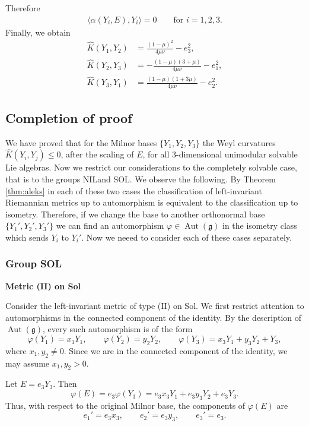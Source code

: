 \documentclass[12pt]{article}
\begin{document}
\noindent Therefore
\begin{align*}
\langle \alpha(Y_i,E),Y_i\rangle=0
\qquad
\text{for } i=1,2,3.
\end{align*}
Finally, we obtain
\begin{align*}
\widehat{K}(Y_1,Y_2) &= 
\frac{(1-\mu)^2}{4\mu\nu} - e_3^2, \\
\widehat{K}(Y_2,Y_3) &= 
-\frac{(1-\mu)(3+\mu)}{4\mu\nu} -e_1^2, \\
\widehat{K}(Y_3,Y_1) &=
\frac{(1-\mu)(1+3\mu)}{4\mu\nu} - e_2^2.
\end{align*}

\subsection{Completion of proof}
We have proved that for the Milnor bases $\{Y_1,Y_2,Y_3\}$ the Weyl curvatures $\widehat{K}(Y_i,Y_j)\leq 0$, after the scaling of $E$, for all 3-dimensional unimodular solvable Lie algebras.  Now we restrict our considerations to the completely solvable case, that is to the groups NILand SOL. We  observe the following. By Theorem \ref{thm:aleks}  in each of these two cases the classification of left-invariant Riemannian metrics up to automorphism is equivalent to the classification  up to isometry. Therefore, if we change the base to another orthonormal base $\{Y_1',Y_2',Y_3'\}$ we can find an automorphism $\varphi\in\operatorname{Aut}(\mathfrak{g})$  in the isometry class which sends $Y_i$ to $Y_i'$.
Now we neeed to consider each of these cases separately.

\subsubsection{Group SOL}
\vskip6pt
{\bf Metric (II) on Sol}

Consider the left-invariant metric of type (II) on Sol. We first restrict
attention to automorphisms in the connected component of the identity. By the
description of \(\operatorname{Aut}(\mathfrak g)\), every such automorphism is
of the form
\[
\varphi(Y_1)=x_1Y_1,\qquad
\varphi(Y_2)=y_2Y_2,\qquad
\varphi(Y_3)=x_3Y_1+y_3Y_2+Y_3,
\]
where \(x_1,y_2\neq 0\). Since we are in the connected component of the
identity, we may assume \(x_1,y_2>0\).

Let $E=e_3Y_3.$ Then
\[ \varphi(E)=e_3\varphi(Y_3) =e_3x_3Y_1+e_3y_3Y_2+e_3Y_3. \]
Thus, with respect to the original Milnor base, the components of
\(\varphi(E)\) are
\[e_1'=e_3x_3,\qquad e_2'=e_3y_3,\qquad e_3'=e_3. \]
\end{document}
